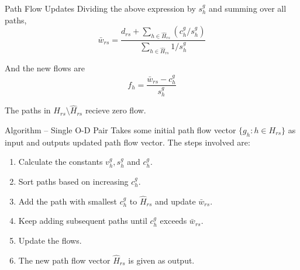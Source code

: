 \documentclass{beamer}
\begin{document}
\begin{frame}{Path Flow Updates}
Dividing the above expression by $s_h^g$ and summing over
all paths,
\[
    \bar{w}_{rs} = \frac{d_{rs} + \sum_{h\in \hat{H}_{rs}}
    ({c_h^g}/{s_h^g})}{\sum_{h\in\hat{H}_{rs}}{1}/{s_h^g}}
\]

And the new flows are
\[
    f_h = \frac{\bar{w}_{rs}-c_h^g}{s^g_h}
\]

The paths in $H_{rs}\setminus \hat{H}_{rs}$ recieve
zero flow.
\end{frame}


\begin{frame}{Algorithm -- Single O-D Pair}
Takes some initial path flow vector $\{g_h: h\in H_{rs}\}$
as input and outputs updated path flow vector.
The steps involved are:
\begin{enumerate}
    \item Calculate the constants $v_h^g, s_h^g$ and
    $c_h^g$.

    \item Sort paths based on increasing $c_h^g$.

    \item Add the path with smallest $c_h^g$ to $\hat{H}_{rs}$
    and update $\bar{w}_{rs}$.

    \item Keep adding subsequent paths until $c_h^g$ exceeds
    $\bar{w}_{rs}$.

    \item Update the flows.

    \item The new path flow vector $\hat{H}_{rs}$ is given as
    output.
\end{enumerate}
\end{frame}
\end{document}
